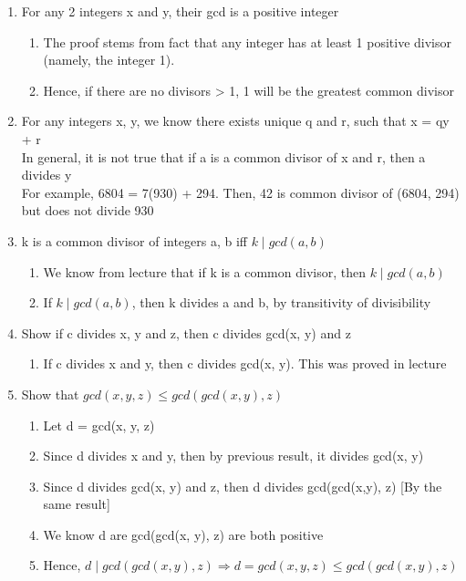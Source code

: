 \documentclass{article}
\begin{document}
\begin{enumerate}
\item For any 2 integers x and y, their gcd is a positive integer
\begin{enumerate}
\item The proof stems from fact that any integer has at least 1 positive divisor (namely, the integer 1).
\item Hence, if there are no divisors > 1, 1 will be the greatest common divisor
\end{enumerate}

\item For any integers x, y, we know there exists unique q and r, such that x = qy + r
\\ In general, it is not true that if a is a common divisor of x and r, then a divides y
\\ For example, 6804 = 7(930) + 294. Then, 42 is common divisor of (6804, 294) but does not divide 930

\item k is a common divisor of integers a, b iff $ k \mid gcd(a, b) $
\begin{enumerate}
\item We know from lecture that if k is a common divisor, then $ k \mid gcd(a,b) $
\item If $ k \mid gcd(a, b) $, then k divides a and b, by transitivity of divisibility
\end{enumerate}


\item Show if c divides x, y and z, then c divides gcd(x, y) and z
\begin{enumerate}
\item If c divides x and y, then c divides gcd(x, y). This was proved in lecture
\end{enumerate}

\item Show that $ gcd(x, y, z) \leq gcd(gcd(x,y), z) $
\begin{enumerate}
\item Let d = gcd(x, y, z)
\item Since d divides x and y, then by previous result, it divides gcd(x, y)
\item Since d divides gcd(x, y) and z, then d divides gcd(gcd(x,y), z) [By the same result]
\item We know d are gcd(gcd(x, y), z) are both positive
\item Hence, $ d \mid gcd(gcd(x,y), z) \Rightarrow d = gcd(x, y, z) \leq gcd(gcd(x,y), z) $
\end{enumerate}


\end{enumerate}
\end{document}
